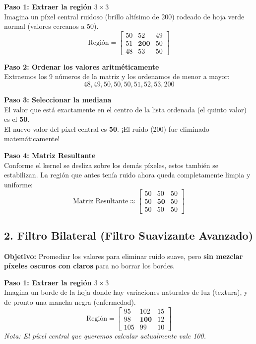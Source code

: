 \documentclass[11pt,a4paper]{article}
\begin{document}
\textbf{Paso 1: Extraer la región $3 \times 3$} \\
Imagina un píxel central ruidoso (brillo altísimo de 200) rodeado de hoja verde normal (valores cercanos a 50).
$$
\text{Región} = \begin{bmatrix}
50 & 52 & 49 \\
51 & \mathbf{200} & 50 \\
48 & 53 & 50
\end{bmatrix}
$$

\textbf{Paso 2: Ordenar los valores aritméticamente} \\
Extraemos los 9 números de la matriz y los ordenamos de menor a mayor:
$$ 48, 49, 50, 50, 50, 51, 52, 53, 200 $$

\textbf{Paso 3: Seleccionar la mediana} \\
El valor que está exactamente en el centro de la lista ordenada (el quinto valor) es el \textbf{50}. \\
El nuevo valor del píxel central es \textbf{50}. ¡El ruido (200) fue eliminado matemáticamente!

\textbf{Paso 4: Matriz Resultante} \\
Conforme el kernel se desliza sobre los demás píxeles, estos también se estabilizan. La región que antes tenía ruido ahora queda completamente limpia y uniforme:
$$
\text{Matriz Resultante} \approx \begin{bmatrix}
50 & 50 & 50 \\
50 & \mathbf{50} & 50 \\
50 & 50 & 50
\end{bmatrix}
$$

\subsection{2. Filtro Bilateral (Filtro Suavizante Avanzado)}
\textbf{Objetivo:} Promediar los valores para eliminar ruido suave, pero \textbf{sin mezclar píxeles oscuros con claros} para no borrar los bordes.

\textbf{Paso 1: Extraer la región $3 \times 3$} \\
Imagina un borde de la hoja donde hay variaciones naturales de luz (textura), y de pronto una mancha negra (enfermedad).
$$
\text{Región} = \begin{bmatrix}
95 & 102 & 15 \\
98 & \mathbf{100} & 12 \\
105 & 99 & 10
\end{bmatrix}
$$
\textit{Nota: El píxel central que queremos calcular actualmente vale 100.}
\end{document}
